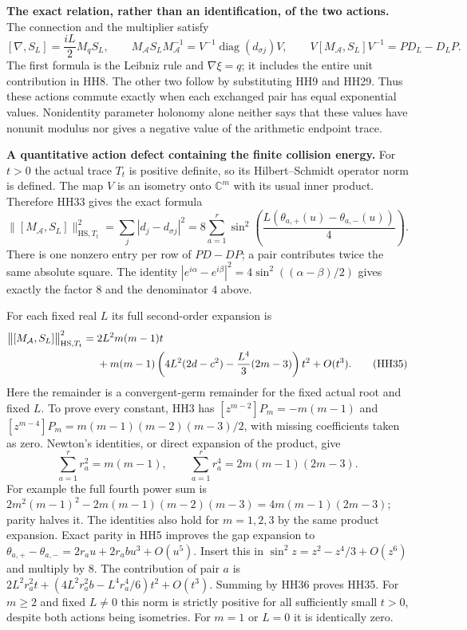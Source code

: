 \documentclass[11pt,a4paper]{article}
\theoremstyle{definition}\newtheorem{definition}[theorem]{Definition}
\begin{document}
\HH\textbf{The exact relation, rather than an identification, of the two actions.}
The connection and the multiplier satisfy
\[
 [\nabla,S_L]=\frac{iL}{2}M_qS_L,\qquad
 M_{\mathcal A}S_LM_{\mathcal A}^{-1}
      =V^{-1}\operatorname{diag}(d_{\sigma j})V,\qquad
 V[M_{\mathcal A},S_L]V^{-1}=P D_L-D_LP .
 \tag{HH33}\label{hh:action-defect}
\]
The first formula is the Leibniz rule and $\nabla\xi=q$;
it includes the entire unit contribution in HH8.
The other two follow by substituting HH9 and HH29.
Thus these actions commute exactly when each exchanged pair has
equal exponential values. Nonidentity parameter holonomy alone
neither says that these values have nonunit modulus nor gives a
negative value of the arithmetic endpoint trace.

\HH\textbf{A quantitative action defect containing the finite collision energy.}
For $t>0$ the actual trace $T_t$ is positive definite, so its
Hilbert--Schmidt operator norm is defined. The map $V$ is an isometry
onto $\mathbb C^m$ with its usual inner product. Therefore HH33 gives
the exact formula
\[
 \bigl\|[M_{\mathcal A},S_L]\bigr\|_{\mathrm{HS},T_t}^2
  =\sum_j|d_j-d_{\sigma j}|^2
  =8\sum_{a=1}^r
       \sin^2\!\left(\frac{L(\theta_{a,+}(u)
                                    -\theta_{a,-}(u))}{4}\right).
 \tag{HH34}\label{hh:hs-exact}
\]
There is one nonzero entry per row of $P D-DP$; a pair contributes
twice the same absolute square. The identity
$|e^{i\alpha}-e^{i\beta}|^2=4\sin^2((\alpha-\beta)/2)$ gives
exactly the factor $8$ and the denominator $4$ above.

For each fixed real $L$ its full second-order expansion is
\begin{align}
 \bigl\|[M_{\mathcal A},S_L]\bigr\|_{\mathrm{HS},T_t}^2
  ={}&2L^2m(m-1)t \notag\\
   &+m(m-1)\left(4L^2(2d-c^2)
                    -\frac{L^4}{3}(2m-3)\right)t^2+O(t^3).
 \tag{HH35}\label{hh:hs-expansion}
\end{align}
Here the remainder is a convergent-germ remainder for the fixed
actual root and fixed $L$. To prove every constant, HH3 has
$[z^{m-2}]P_m=-m(m-1)$ and
$[z^{m-4}]P_m=m(m-1)(m-2)(m-3)/2$, with missing coefficients
taken as zero. Newton's identities, or direct expansion of the
product, give
\[
 \sum_{a=1}^r r_a^2=m(m-1),\qquad
 \sum_{a=1}^r r_a^4=2m(m-1)(2m-3).
 \tag{HH36}
\]
For example the full fourth power sum is
$2m^2(m-1)^2-2m(m-1)(m-2)(m-3)
=4m(m-1)(2m-3)$; parity halves it.
The identities also hold for $m=1,2,3$ by the same product expansion.
Exact parity in HH5 improves the gap expansion to
$\theta_{a,+}-\theta_{a,-}=2r_au+2r_ab u^3+O(u^5)$.
Insert this in $\sin^2z=z^2-z^4/3+O(z^6)$ and multiply by $8$.
The contribution of pair $a$ is
$2L^2r_a^2t+(4L^2r_a^2b-L^4r_a^4/6)t^2+O(t^3)$.
Summing by HH36 proves HH35.
For $m\ge2$ and fixed $L\ne0$ this norm is strictly positive for all
sufficiently small $t>0$, despite both actions being isometries.
For $m=1$ or $L=0$ it is identically zero.
\end{document}
